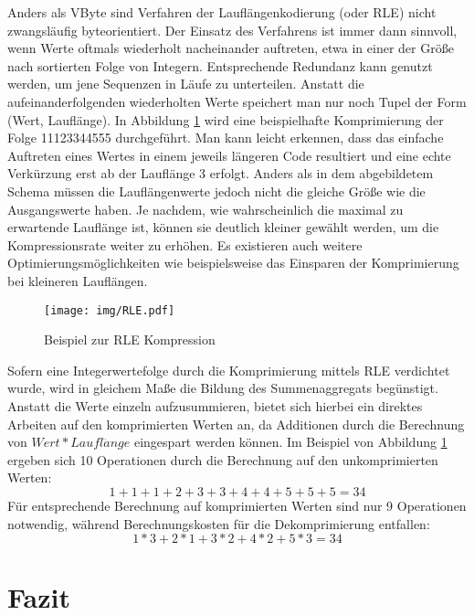 Anders als VByte sind Verfahren der Lauflängenkodierung \cite{Reghbati1981} (oder \ac{RLE}) nicht zwangsläufig byteorientiert. Der Einsatz des Verfahrens ist immer dann sinnvoll, wenn Werte oftmals wiederholt nacheinander auftreten, etwa in einer der Größe nach sortierten Folge von Integern. Entsprechende Redundanz kann genutzt werden, um jene Sequenzen in Läufe zu unterteilen. Anstatt die aufeinanderfolgenden wiederholten Werte speichert man nur noch Tupel der Form (Wert, Lauflänge). In Abbildung \ref{fig:rle} wird eine beispielhafte Komprimierung der Folge 11123344555 durchgeführt. Man kann leicht erkennen, dass das einfache Auftreten eines Wertes in einem jeweils längeren Code resultiert und eine echte Verkürzung erst ab der Lauflänge 3 erfolgt. Anders als in dem abgebildetem Schema müssen die Lauflängenwerte jedoch nicht die gleiche Größe wie die Ausgangswerte haben. Je nachdem, wie wahrscheinlich die maximal zu erwartende Lauflänge ist, können sie deutlich kleiner gewählt werden, um die Kompressionsrate weiter zu erhöhen. Es existieren auch weitere Optimierungsmöglichkeiten wie beispielsweise das Einsparen der Komprimierung bei kleineren Lauflängen.

\begin{figure}
	\texttt{[image: img/RLE.pdf]}
	\centering
	\caption{Beispiel zur RLE Kompression}
	\label{fig:rle}
\end{figure}

Sofern eine Integerwertefolge durch die Komprimierung mittels \ac{RLE} verdichtet wurde, wird in gleichem Maße die Bildung des Summenaggregats begünstigt. Anstatt die Werte einzeln aufzusummieren, bietet sich hierbei ein direktes Arbeiten auf den komprimierten Werten an, da Additionen durch die Berechnung von $Wert * Laufl\ddot{a}nge$ eingespart werden können. Im Beispiel von Abbildung \ref{fig:rle} ergeben sich 10 Operationen durch die Berechnung auf den unkomprimierten Werten:
\begin{equation*}
	1 + 1 + 1 + 2 + 3 + 3 + 4 + 4 + 5 + 5 + 5 = 34
\end{equation*}
Für entsprechende Berechnung auf komprimierten Werten sind nur 9 Operationen notwendig, während Berechnungskosten für die Dekomprimierung entfallen:
\begin{equation*}
	1 * 3 + 2 * 1 + 3 * 2 + 4 * 2 + 5 * 3 = 34
\end{equation*}

\section{Fazit}

